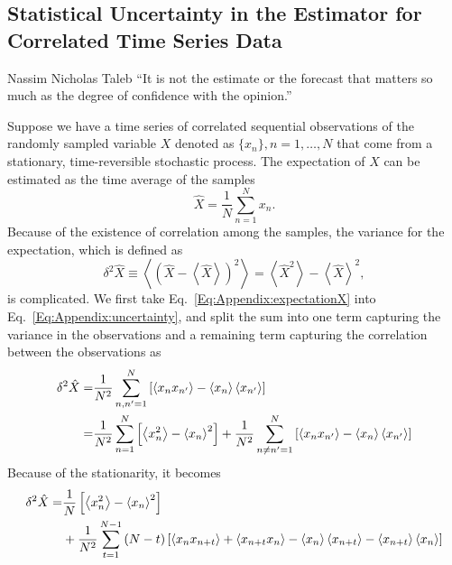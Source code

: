 \begin{appendices}
\chapter{Statistical Uncertainty in the Estimator for Correlated Time Series Data\label{chapter:Appendix:Uncertainty}}
\begin{chapquote}{Nassim Nicholas Taleb%
	}
	``It is not the estimate or the forecast that matters so much as the degree of confidence with the opinion.''
\end{chapquote}
Suppose we have a time series of correlated sequential observations of the randomly sampled variable $X$ denoted as $\{x_n\}, n=1,\dots,N$ that come from a stationary, time-reversible stochastic process. The expectation of $X$ can be estimated as the time average of the samples
\begin{equation}
  \hat X=\frac 1 N \sum\limits_{n=1}^{N} x_n.
  \label{Eq:Appendix:expectationX}
\end{equation}
Because of the existence of correlation among the samples, the variance for the expectation, which is defined as
\begin{equation}
	\delta^2 \hat X \equiv \left<\left(\hat X-\left<\hat X\right>\right)^2\right> = \left<\hat X^2 \right> -\left<\hat X\right>^2,
	\label{Eq:Appendix:uncertainty}
\end{equation}
is complicated. We first take Eq.~\ref{Eq:Appendix:expectationX} into Eq.~\ref{Eq:Appendix:uncertainty}, and split the sum into one term capturing the variance in the observations and a remaining term capturing the correlation between the observations as
\begin{align}
	\delta^2 \hat X=&\frac{1}{N^2}\sum\limits_{n,n^\prime=1}^{N}\left[\left<x_nx_{n^\prime}\right>-\left<x_n\right>\left<x_{n^\prime}\right>\right]\notag\\
	               =&\frac{1}{N^2}\sum\limits_{n=1}^{N}\left[\left<x_n^2\right>-\left<x_n\right>^2\right]+\frac{1}{N^2}\sum\limits_{n\neq n^\prime=1}^{N}\left[\left<x_nx_{n^\prime}\right>-\left<x_n\right>\left<x_{n^\prime}\right>\right]
\end{align}
Because of the stationarity, it becomes
\begin{align}
	\delta^2 \hat X=& \frac 1N\left[\left<x_n^2\right>-\left<x_n\right>^2\right] \notag\\
	&+\frac 1{N^2}\sum\limits_{t=1}^{N-1}\left(N-t\right)\left[\left<x_nx_{n+t}\right>+\left<x_{n+t}x_n\right>-\left<x_n\right>\left<x_{n+t}\right>-\left<x_{n+t}\right>\left<x_n\right>\right]

\end{align}
\end{appendices}
